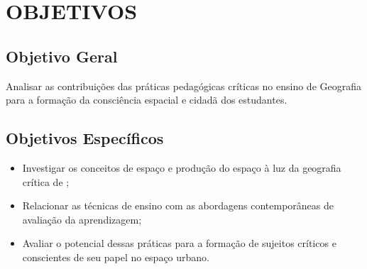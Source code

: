 \chapter{OBJETIVOS}

\section{Objetivo Geral}
Analisar as contribuições das práticas pedagógicas críticas no ensino de Geografia para a formação da consciência espacial e cidadã dos estudantes.

\section{Objetivos Específicos}
\begin{itemize}
    \item Investigar os conceitos de espaço e produção do espaço à luz da geografia crítica de \cite{milton-ne};
    \item Relacionar as técnicas de ensino com as abordagens contemporâneas de avaliação da aprendizagem;
    \item Avaliar o potencial dessas práticas para a formação de sujeitos críticos e conscientes de seu papel no espaço urbano.
\end{itemize}